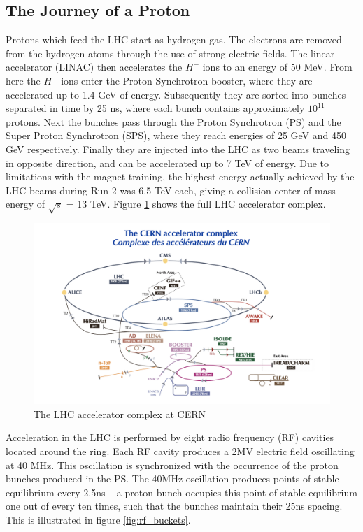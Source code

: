  \subsection{The Journey of a Proton}
 Protons which feed the LHC start as hydrogen gas. The electrons are removed from the hydrogen atoms through the use of strong electric fields. The linear accelerator (LINAC) then accelerates the $H^-$ ions to an energy of 50 MeV. From here the $H^-$ ions enter the Proton Synchrotron booster, where they are accelerated up to 1.4 GeV of energy. Subsequently they are sorted into bunches separated in time by 25 ns,  where each bunch contains approximately $10^11$ protons. Next the bunches pass through the Proton Synchrotron (PS) and the Super Proton Synchrotron (SPS), where they reach energies of 25 GeV and 450 GeV respectively. Finally they are injected into the LHC as two beams traveling in opposite direction, and can be accelerated up to 7 TeV of energy. Due to limitations with the magnet training, the highest energy actually achieved by the LHC beams during Run 2 was 6.5 TeV each, giving a collision center-of-mass energy of $\sqrt{s}$ = 13 TeV. Figure \ref{fig:accelerator_complex} shows the full LHC accelerator complex.\\

\begin{figure}
	\includegraphics[width=\textwidth]{figures/accelerator_complex.png}
	\caption{The LHC accelerator complex at CERN \cite{cern_accelerator_complex}}
	\label{fig:accelerator_complex}
\end{figure}

 Acceleration in the LHC is performed by eight radio frequency (RF) cavities located around the ring. Each RF cavity produces a 2MV electric field oscillating at 40 MHz. This oscillation is synchronized with the occurrence of the proton bunches produced in the PS. The 40MHz oscillation produces points of stable equilibrium every 2.5ns -- a proton bunch occupies this point of stable equilibrium one out of every ten times, such that the bunches maintain their 25ns spacing. This is illustrated in figure \ref{fig:rf_buckets}. \\
 
